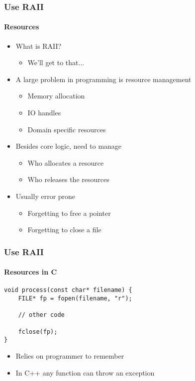 \begin{frame}
    \frametitle{\declarerule Use RAII}
    \framesubtitle{Resources}
    \begin{itemize}
        \item What is RAII?
            \begin{itemize}
                \item We'll get to that...
            \end{itemize}
        \item A large problem in programming is resource management
            \begin{itemize}
                \item Memory allocation
                \item IO handles
                \item Domain specific resources
            \end{itemize}
        \item Besides core logic, need to manage
            \begin{itemize}
                \item Who allocates a resource
                \item Who releases the resources
            \end{itemize}
        \item Usually error prone
            \begin{itemize}
                \item Forgetting to free a pointer
                \item Forgetting to close a file
            \end{itemize}
    \end{itemize}
\end{frame}

\begin{frame}[fragile]
    \frametitle{\declarerule Use RAII}
    \framesubtitle{Resources in C}
    \begin{lstlisting}[title=Reading a file in C]
void process(const char* filename) {
    FILE* fp = fopen(filename, "r");

    // other code

    fclose(fp);
}
    \end{lstlisting}
    \begin{itemize}
        \item Relies on programmer to remember
        \item In C++ any function can throw an exception
    \end{itemize}
\end{frame}

